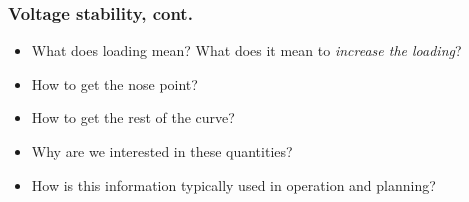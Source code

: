 \documentclass{beamer}
\newlength\fheight
\newlength\fwidth
\begin{document}
\begin{frame}
  \frametitle{Voltage stability, cont.}
  \begin{itemize}
  \item What does loading mean? What does it mean to \emph{increase the loading}?
  \item How to get the nose point?
  \item How to get the rest of the curve?
  \item Why are we interested in these quantities?
  \item How is this information typically used in operation and planning?
  \end{itemize}
\setlength\fheight{0.3\textheight} 
\setlength{}

\end{frame}
\end{document}
